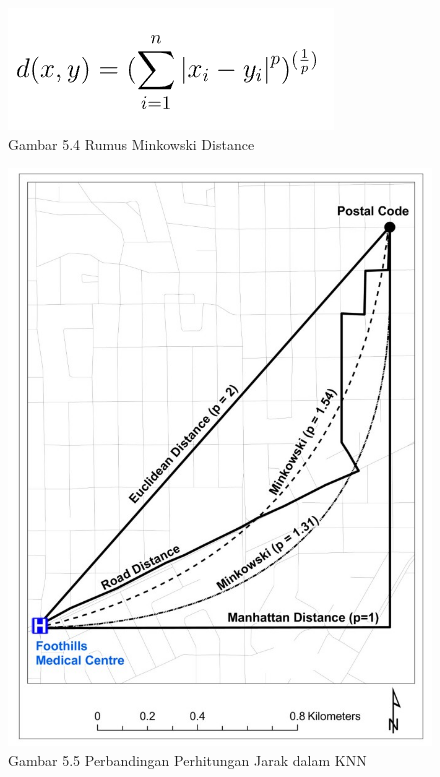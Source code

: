 \documentclass[
  letterpaper,
  DIV=11,
  numbers=noendperiod]{scrreprt}
\begin{document}
\begin{figure}

{\centering \includegraphics{Asset/minkowskidistance.png}

}

\caption{Gambar 5.4 Rumus Minkowski Distance}

\end{figure}

\begin{figure}

{\centering \includegraphics{Asset/perbandingan_jarak.jpg}

}

\caption{Gambar 5.5 Perbandingan Perhitungan Jarak dalam KNN}

\end{figure}
\end{document}
